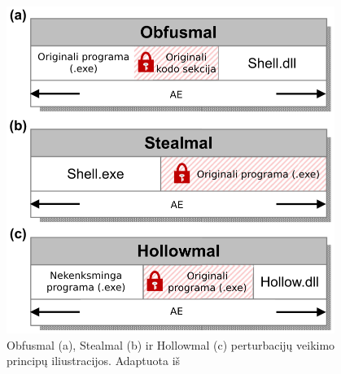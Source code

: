 \begin{figure}[h]
    \begin{small}
        \begin{center}
            \includegraphics[width=0.95\textwidth]{img/complex-perturbations.png}
        \end{center}
        \caption{Obfusmal (a), Stealmal (b) ir Hollowmal (c) perturbacijų veikimo principų iliustracijos. Adaptuota iš \cite{zhongReinforcementLearningBased2022}}\label{fig:perturbations}
    \end{small}
\end{figure}

